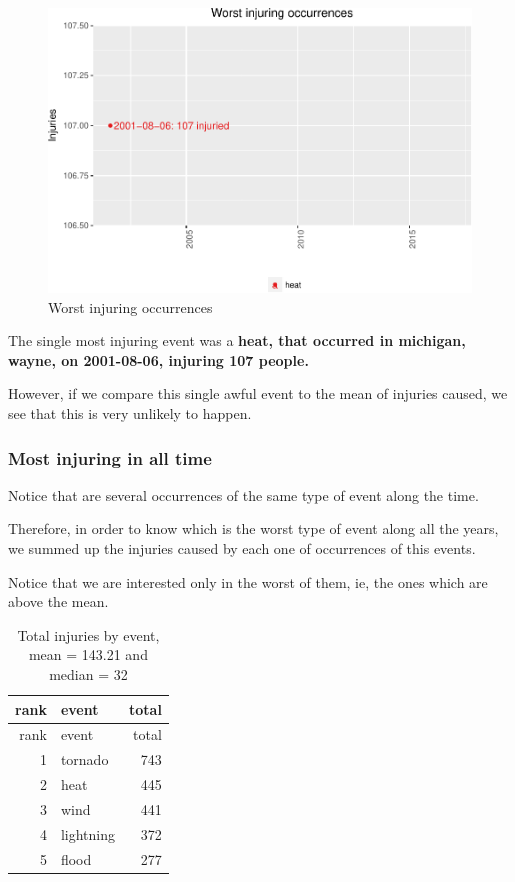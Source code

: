 \documentclass[]{article}
\begin{document}
\begin{figure}[htbp]
\centering
\includegraphics{readme_files/figure-latex/injuring-single-plot-1.pdf}
\caption{Worst injuring occurrences}
\end{figure}

The single most injuring event was a \textbf{heat, that occurred in
michigan, wayne, on 2001-08-06, injuring 107 people.}

However, if we compare this single awful event to the mean of injuries
caused, we see that this is very unlikely to happen.

\subsubsection{Most injuring in all
time}\label{most-injuring-in-all-time}

Notice that are several occurrences of the same type of event along the
time.

Therefore, in order to know which is the worst type of event along all
the years, we summed up the injuries caused by each one of occurrences
of this events.

Notice that we are interested only in the worst of them, ie, the ones
which are above the mean.

\begin{longtable}[]{@{}rlr@{}}
\caption{Total injuries by event, mean = 143.21 and median =
32}\tabularnewline
\toprule
rank & event & total\tabularnewline
\midrule
\endfirsthead
\toprule
rank & event & total\tabularnewline
\midrule
\endhead
1 & tornado & 743\tabularnewline
2 & heat & 445\tabularnewline
3 & wind & 441\tabularnewline
4 & lightning & 372\tabularnewline
5 & flood & 277\tabularnewline
\bottomrule
\end{longtable}
\end{document}
